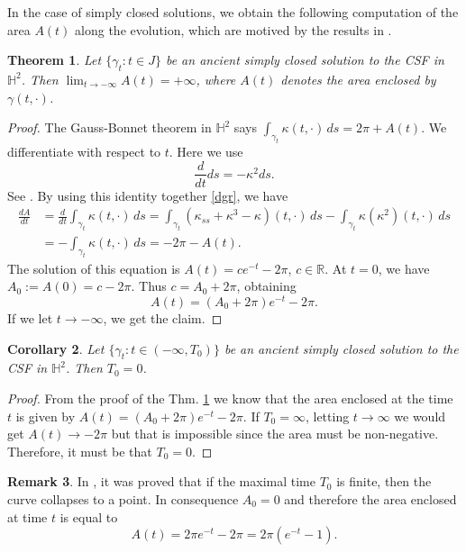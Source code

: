 \documentclass[12pt]{amsart}
\theoremstyle{plain}
\newtheorem{theorem}{Theorem}[section]
\newtheorem{corollary}[theorem]{Corollary}
\theoremstyle{definition}
\newtheorem{remark}[theorem]{Remark}
\def\h{\mathbb H}
\def\r{\mathbb R}
\begin{document}
In the   case of simply closed solutions, we obtain the following computation of the area $A(t)$ along the evolution, which are motived by the results in \cite{bl}.  
\begin{theorem}
\label{t51}
Let $\{\gamma_t\colon t \in J\}$ be an   ancient simply closed solution to the CSF in $\h^2$. Then $\displaystyle \lim_{t \to - \infty}A(t) = + \infty$,  where $A(t)$ denotes the area enclosed by $\gamma(t, \cdot)$. 
\end{theorem}
\begin{proof}
 The Gauss-Bonnet theorem in $\h^2$ says  $\int_{\gamma_t} \kappa(t,\cdot) \, ds = 2\pi + A(t)$. We differentiate with respect to $t$. Here we use 
$$ \frac{d}{dt} ds = - \kappa^2 ds.$$
See \cite[p. 75]{gr}. By using this identity together \eqref{dgr},  we have 
\begin{equation*}
\begin{split}
\frac{dA}{dt} &= \frac{d}{dt} \int_{\gamma_t}\kappa(t,\cdot) \, ds =\int_{\gamma_t}(\kappa_{ss}+\kappa^3-\kappa)(t,\cdot)\, ds-\int_{\gamma_t}\kappa(\kappa^2)(t,\cdot)\, ds\\
&= - \int_{\gamma_t} \kappa(t,\cdot) \, ds = - 2\pi - A(t).
\end{split}
\end{equation*}
The solution of this equation is $A(t)=c e^{-t}-2\pi$, $c\in\r$. At $t=0$, we have $A_0:=A(0)=c-2\pi$. Thus $c=A_0+2\pi$, obtaining
 $$A(t) = (A_0 + 2\pi)e^{-t} - 2\pi.$$ If we let $t \to - \infty$,  we   get the claim.
\end{proof}

\begin{corollary}
Let $\{\gamma_t\colon t \in ( - \infty, T_0 ) \}$ be an   ancient simply closed solution  to the CSF in $\h^2$. Then $T_0 = 0$.
\end{corollary}
\begin{proof}
From the proof of the Thm. \ref{t51} we know that the area enclosed at the time $t$ is given by   $A(t) = (A_0 + 2\pi)e^{-t} - 2\pi$. If $T_0 = \infty$,  letting $t \to \infty$ we would get $A(t) \to -2\pi$ but that is impossible since the area must be non-negative. Therefore, it must be that $T_0 = 0$.
\end{proof}

 
\begin{remark} 
In \cite{gr}, it was proved    that if the maximal time $T_0$ is finite, then the curve collapses to a point. In consequence  $A_0 = 0$ and therefore the area enclosed at time $t$ is equal to  
\begin{equation}\label{aa}
A(t) =2\pi e^{-t} - 2\pi = 2\pi (e^{-t} - 1).
\end{equation}
\end{remark}
 
\end{document}
